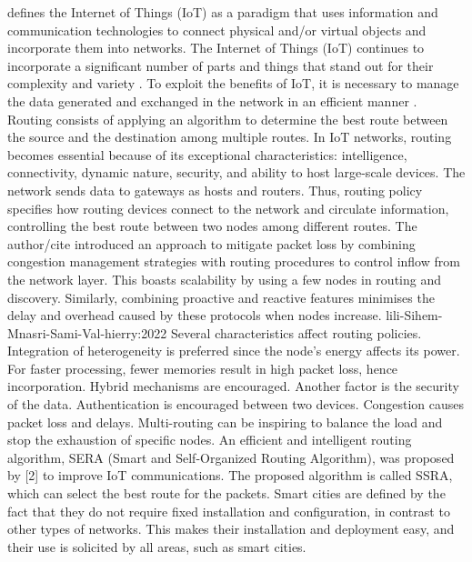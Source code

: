 \cite{plageras-psannis:2017} defines the Internet of Things (IoT) as a paradigm that uses information and communication 
technologies to connect physical and/or virtual objects and incorporate them into networks. The Internet of Things (IoT) 
continues to incorporate a significant number of parts and things that stand out for their complexity and variety 
\cite{amrioui-Sofiane-Hamrioui-Camil-Lloret-Jaime-Lorenz-Pascal:2018}. To exploit the benefits of IoT, it is necessary to manage 
the data generated and exchanged in the network in an efficient manner \cite{Tlili-Sihem-Mnasri-Sami-Val-hierry:2022}. 
Routing consists of applying an algorithm to determine the best route between the source and 
the destination among multiple routes. In IoT networks, routing becomes essential because of its exceptional characteristics: 
intelligence, connectivity, dynamic nature, security, and ability to host large-scale devices. The network sends data to gateways 
as hosts and routers\cite{ALZUBI2019106:2019}. Thus, routing policy specifies how routing devices connect to 
the network and circulate information, controlling the best route between two nodes among different routes. The author/cite 
introduced an approach to mitigate packet loss by combining congestion management strategies with routing procedures to control
 inflow from the network layer. This boasts scalability by using a few nodes in routing and discovery. Similarly, combining 
 proactive and reactive features minimises the delay and overhead caused by these protocols when nodes increase. 
 lili-Sihem-Mnasri-Sami-Val-hierry:2022 Several characteristics affect routing policies. Integration of heterogeneity is 
 preferred since the node’s energy affects its power. For faster processing, fewer memories result in high packet loss, 
 hence incorporation. Hybrid mechanisms are encouraged. Another factor is the security of the data. Authentication is 
 encouraged between two devices. Congestion causes packet loss and delays. Multi-routing can be inspiring to balance the 
 load and stop the exhaustion of specific nodes. 
 An efficient and intelligent routing algorithm, SERA (Smart and Self-Organized Routing Algorithm), was proposed by [2] to 
 improve IoT communications. The proposed algorithm is called SSRA, which can select the best route for the packets. 
 Smart cities are defined by the fact that they do not require fixed installation and configuration, in contrast to other types
  of networks. This makes their installation and deployment easy, and their use is solicited by all areas, such as smart cities.
 

